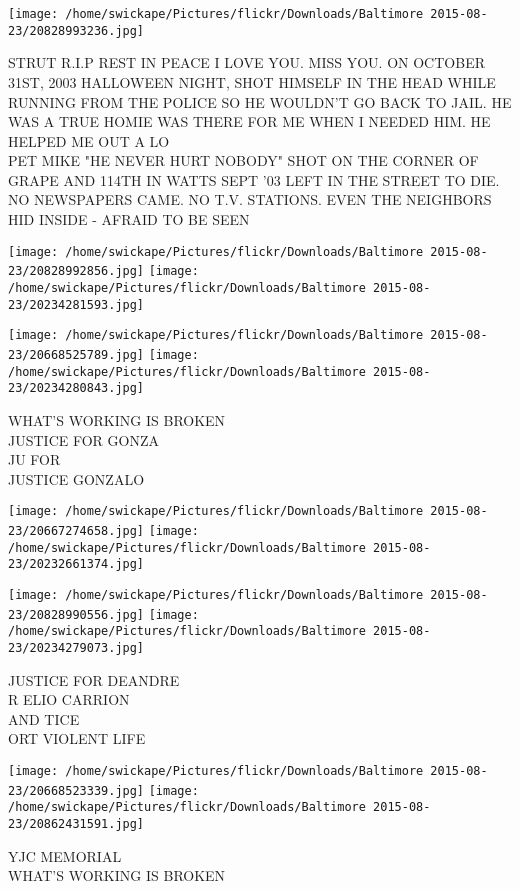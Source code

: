 \documentclass[10pt,letterpaper]{article}
\begin{document}
\vspace{0.25in}
\texttt{[image: /home/swickape/Pictures/flickr/Downloads/Baltimore 2015-08-23/20828993236.jpg]}

STRUT R.I.P REST IN PEACE I LOVE YOU.  MISS YOU.  ON OCTOBER 31ST, 2003 HALLOWEEN NIGHT, SHOT HIMSELF IN THE HEAD WHILE RUNNING FROM THE POLICE SO HE WOULDN'T GO BACK TO JAIL.  HE WAS A TRUE HOMIE WAS THERE FOR ME WHEN I NEEDED HIM.  HE HELPED ME OUT A LO\\
PET MIKE "HE NEVER HURT NOBODY" SHOT ON THE CORNER OF GRAPE AND 114TH IN WATTS SEPT '03 LEFT IN THE STREET TO DIE.  NO NEWSPAPERS CAME.  NO T.V. STATIONS.  EVEN THE NEIGHBORS HID INSIDE {-} AFRAID TO BE SEEN\\
\pagebreak

\texttt{[image: /home/swickape/Pictures/flickr/Downloads/Baltimore 2015-08-23/20828992856.jpg]}
\texttt{[image: /home/swickape/Pictures/flickr/Downloads/Baltimore 2015-08-23/20234281593.jpg]}

\texttt{[image: /home/swickape/Pictures/flickr/Downloads/Baltimore 2015-08-23/20668525789.jpg]}
\texttt{[image: /home/swickape/Pictures/flickr/Downloads/Baltimore 2015-08-23/20234280843.jpg]}

WHAT'S WORKING IS BROKEN\\
JUSTICE FOR GONZA\\
JU FOR\\
JUSTICE GONZALO\\
\pagebreak

\texttt{[image: /home/swickape/Pictures/flickr/Downloads/Baltimore 2015-08-23/20667274658.jpg]}
\texttt{[image: /home/swickape/Pictures/flickr/Downloads/Baltimore 2015-08-23/20232661374.jpg]}

\texttt{[image: /home/swickape/Pictures/flickr/Downloads/Baltimore 2015-08-23/20828990556.jpg]}
\texttt{[image: /home/swickape/Pictures/flickr/Downloads/Baltimore 2015-08-23/20234279073.jpg]}

JUSTICE FOR DEANDRE\\
R ELIO CARRION\\
AND TICE\\
ORT VIOLENT LIFE\\
\pagebreak

\texttt{[image: /home/swickape/Pictures/flickr/Downloads/Baltimore 2015-08-23/20668523339.jpg]}
\texttt{[image: /home/swickape/Pictures/flickr/Downloads/Baltimore 2015-08-23/20862431591.jpg]}

YJC MEMORIAL\\
WHAT'S WORKING IS BROKEN\\
\pagebreak
\end{document}
